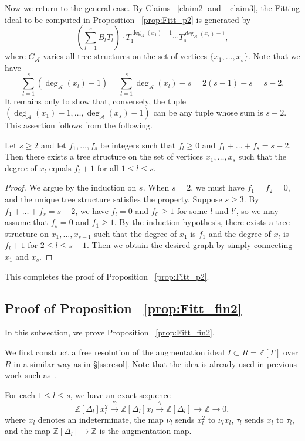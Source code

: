 \documentclass[11pt]{article}
\theoremstyle{definition}
\numberwithin{equation}{section}
\newcommand{\Z}{\mathbb{Z}}
\newcommand{\cA}{\mathcal{A}}
\begin{document}
Now we return to the general case.
By Claims ~\ref{claim2} and ~\ref{claim3}, the Fitting ideal to be computed in Proposition ~\ref{prop:Fitt_p2} is generated by
\[
\left(\sum_{l = 1}^s B_l T_l \right) \cdot T_1^{\deg_{\cA}(x_1)-1} \cdots T_s^{\deg_{\cA}(x_s) - 1},
\]
where $G_{\cA}$ varies all tree structures on the set of vertices $\{x_1, \dots, x_s \}$.
Note that we have
\[
\sum_{l=1}^s (\deg_{\cA}(x_l) - 1) 
= \sum_{l=1}^s \deg_{\cA}(x_l) - s
= 2(s-1) - s = s-2.
\]
It remains only to show that, conversely, the tuple $(\deg_{\cA}(x_1) - 1, \dots, \deg_{\cA}(x_s) - 1)$ can be any tuple whose sum is $s - 2$.
This assertion follows from the following.

\begin{claim}
Let $s \geq 2$ and let $f_1, \dots, f_s$ be integers such that $f_l \geq 0$ and $f_1 + \dots + f_s = s - 2$.
Then there exists a tree structure on the set of vertices $x_1, \dots, x_s$ such that the degree of $x_l$ equals $f_l + 1$ for all $1 \leq l \leq s$.
\end{claim}

\begin{proof}
We argue by the induction on $s$.
When $s = 2$, we must have $f_1 = f_2 = 0$, and the unique tree structure satisfies the property.
Suppose $s \geq 3$.
By $f_1 + \dots + f_s = s - 2$, we have $f_l = 0$ and $f_{l'} \geq 1$ for some $l$ and $l'$, so we may assume that $f_s = 0$ and $f_1 \geq 1$.
By the induction hypothesis, there exists a tree structure on $x_1, \dots, x_{s-1}$ such that the degree of $x_1$ is $f_1$ and the degree of $x_l$ is $f_l+1$ for $2 \leq l \leq s-1$.
Then we obtain the desired graph by simply connecting $x_1$ and $x_s$.
\end{proof}

This completes the proof of Proposition ~\ref{prop:Fitt_p2}.

\subsection{Proof of Proposition ~\ref{prop:Fitt_fin2}}\label{ss:thm2}

In this subsection, we prove Proposition ~\ref{prop:Fitt_fin2}.

We first construct a free resolution of the augmentation ideal $I \subset R = \Z[\Gamma]$ over $R$ in a similar way as in \S\ref{ss:resol}.
Note that the idea is already used in previous work such as~\cite{AK21}.

For each $1 \leq l \leq s$, we have an exact sequence
\[
\Z[\Delta_l] x_l^2 \overset{\nu_l}{\to} \Z[\Delta_l] x_l \overset{\tau_l}{\to} \Z[\Delta_l] \to \Z \to 0,
\]
where $x_l$ denotes an indeterminate, the map $\nu_l$ sends $x_l^2$ to $\nu_l x_l$, $\tau_l$ sends $x_l$ to $\tau_l$, and the map $\Z[\Delta_l] \to \Z$ is the augmentation map.
\end{document}
